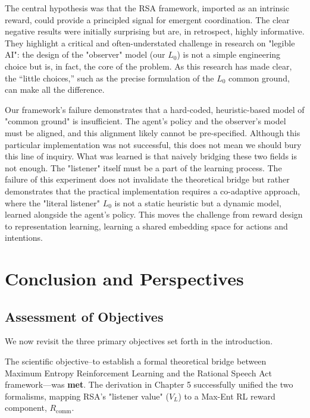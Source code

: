 \documentclass[12pt, a4paper]{report}
\newcommand{\Rcomm}{R_{\text{comm}}}
\begin{document}
The central hypothesis was that the RSA framework, imported as an intrinsic reward, could provide a principled signal for emergent coordination. The clear negative results were initially surprising but are, in retrospect, highly informative. They highlight a critical and often-understated challenge in research on "legible AI": the design of the "observer" model (our $L_0$) is not a simple engineering choice but is, in fact, the core of the problem. As this research has made clear, the ``little choices,'' such as the precise formulation of the $L_0$ common ground, can make all the difference.

Our framework's failure demonstrates that a hard-coded, heuristic-based model of "common ground" is insufficient. The agent's policy and the observer's model must be aligned, and this alignment likely cannot be pre-specified. Although this particular implementation was not successful, this does not mean we should bury this line of inquiry. What was learned is that naively bridging these two fields is not enough. The "listener" itself must be a part of the learning process. The failure of this experiment does not invalidate the theoretical bridge but rather demonstrates that the practical implementation requires a co-adaptive approach, where the "literal listener" $L_0$ is not a static heuristic but a dynamic model, learned alongside the agent's policy. This moves the challenge from reward design to representation learning, learning a shared embedding space for actions and intentions.

\chapter{Conclusion and Perspectives}
\label{chap:conclusion}

\section{Assessment of Objectives}
We now revisit the three primary objectives set forth in the introduction.

The scientific objective--to establish a formal theoretical bridge between Maximum Entropy Reinforcement Learning and the Rational Speech Act framework---was \textbf{met}. The derivation in Chapter 5 successfully unified the two formalisms, mapping RSA's "listener value" ($V_L$) to a Max-Ent RL reward component, $\Rcomm$.
\end{document}
